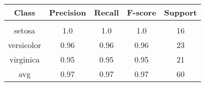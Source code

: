 \begin{table}
\begin{tabular}{c | c c c c}
Class & Precision & Recall & F-score & Support\\
\hline
\hline\\
setosa & 1.0 & 1.0 & 1.0 & 16\\
versicolor & 0.96 & 0.96 & 0.96 & 23\\
virginica & 0.95 & 0.95 & 0.95 & 21\\
avg & 0.97 & 0.97 & 0.97 & 60\\
\end{tabular}
\end{table}
